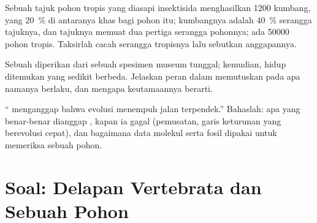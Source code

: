 \begin{exercise}[$\star\star\star$]\label{exo:b1:classifying-biodiversity:10}
Sebuah tajuk pohon tropis yang diasapi insektisida menghasilkan 1200
 kumbang, yang \qty{20}{\%} di antaranya khas bagi 
pohon itu; kumbangnya adalah \qty{40}{\%} serangga tajuknya, dan
tajuknya memuat dua pertiga serangga pohonnya; ada \num{50000} 
pohon tropis. Taksirlah cacah  serangga tropisnya lalu
sebutkan anggapannya.
\end{exercise}

\begin{exercise}[$\star\star\star$]\label{exo:b1:classifying-biodiversity:11}
Sebuah  diperikan dari sebuah spesimen museum tunggal;
kemudian,  hidup ditemukan yang sedikit berbeda. Jelaskan
peran  dalam memutuskan pada apa namanya berlaku, dan
mengapa keutamaannya berarti.
\end{exercise}

\begin{exercise}[$\star\star\star$]\label{exo:b1:classifying-biodiversity:12}
`` menganggap bahwa evolusi menempuh jalan terpendek.''
Bahaslah: apa yang benar-benar dianggap , kapan ia gagal
(pemusatan, garis keturunan yang berevolusi cepat), dan bagaimana data
molekul serta fosil dipakai untuk memeriksa sebuah pohon.
\end{exercise}

\section{Soal: Delapan Vertebrata dan Sebuah Pohon}

